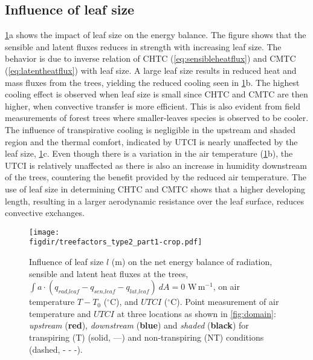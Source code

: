 \subsection{Influence of leaf size}

\cref{fig:treefactorspart1}a shows the impact of leaf size on the energy balance. The figure shows that the sensible and latent fluxes reduces in strength with increasing leaf size. The behavior is due to inverse relation of CHTC (\cref{eq:sensibleheatflux}) and CMTC (\cref{eq:latentheatflux}) with leaf size. A large leaf size results in reduced heat and mass fluxes from the trees, yielding the reduced cooling seen in \cref{fig:treefactorspart1}b. The highest cooling effect is observed when leaf size is small since CHTC and CMTC are then higher, when convective transfer is more efficient. This is also evident from field measurements of forest trees where smaller-leaves species is observed to be cooler\citep{Leuzinger2007,Leuzinger2010}. The influence of transpirative cooling is negligible in the upstream and shaded region and the thermal comfort, indicated by UTCI is nearly unaffected by the leaf size, \cref{fig:treefactorspart1}c. Even though there is a variation in the air temperature (\cref{fig:treefactorspart1}b), the UTCI is relatively unaffected as there is also an increase in humidity downstream of the trees, countering the benefit provided by the reduced air temperature. The use of leaf size in determining CHTC and CMTC shows that a higher developing length, resulting in a larger aerodynamic resistance over the leaf surface, reduces convective exchanges.


	\begin{figure}[t]
	\centering
	\texttt{[image: \\figdir/treefactors\_type2\_part1-crop.pdf]}
	\caption{Influence of leaf size $l$ (m)  on the net energy balance of radiation, sensible and latent heat fluxes at the trees, $\int a \cdot (q_{\textit{rad,leaf}}-q_{\textit{sen,leaf}}-q_{\textit{lat,leaf}})\ dA = 0$ W\,m$^{-1}$,  on air temperature $T-T_0$ ($^{\circ}$C), and  $\textit{UTCI}$ ($^{\circ}$C). Point measurement of air temperature and $UTCI$ at three locations as shown in \cref{fig:domain}: \textit{upstream} ({\color{flatuidarkred}\textbf{red}}), \textit{downstream} ({\color{flatuidarkblue}\textbf{blue}}) and \textit{shaded} (\textbf{black}) for transpiring (T) (solid, ---) and non-transpiring (NT) conditions (dashed, - - -).}
	\label{fig:treefactorspart1}
	\end{figure}

